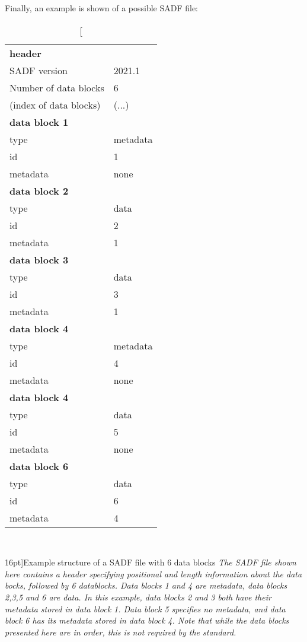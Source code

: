 \documentclass[pagesize=a4]{tufte-book}
\begin{document}
Finally, an example is shown of a possible SADF file:
\begin{table}[ht]
	\centering
	\selectfont
	\begin{tabular}{ll}
		\toprule
		\textbf{header} & \\
		\quad SADF version & 2021.1\\
		\quad Number of data blocks & 6\\
		\quad (index of data blocks) & (...)\\
		\textbf{data block 1} & \\
		\quad type & metadata\\
		\quad id & 1 \\
		\quad metadata & none\\
		\textbf{data block 2} & \\
		\quad type & data\\
		\quad id & 2 \\
		\quad metadata & 1\\
		\textbf{data block 3} & \\
		\quad type & data\\
		\quad id & 3 \\
		\quad metadata & 1\\
		\textbf{data block 4} & \\
		\quad type & metadata\\
		\quad id & 4 \\
		\quad metadata & none\\
		\textbf{data block 4} & \\
		\quad type & data\\
		\quad id & 5 \\
		\quad metadata & none\\
		\textbf{data block 6} & \\
		\quad type & data\\
		\quad id & 6 \\
		\quad metadata & 4\\
		\bottomrule
	\end{tabular}
	~\label{tab:sample_sadf_file}
	\caption[Example structure of a SADF file with 6 data blocks][16pt]{Example structure of a SADF file with 6 data blocks\emph{ The SADF file shown here contains a header specifying positional and length information about the data bocks, followed by 6 datablocks. Data blocks 1 and 4 are metadata, data blocks 2,3,5 and 6 are data. In this example, data blocks 2 and 3 both have their metadata stored in data block 1. Data block 5 specifies no metadata, and data block 6 has its metadata stored in data block 4. Note that while the data blocks presented here are in order, this is not required by the standard.}}
\end{table}
\end{document}
